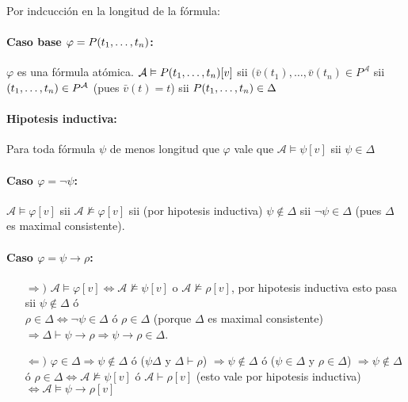 \begin{demo}
	Por indcucción en la longitud de la fórmula:
	
	\paragraph{Caso base $\varphi = P(t_1,\dots, t_{n})$:} $\varphi$ es una fórmula atómica. $\mathcal{A}\vDash P(t_1,\dots, t_{n})[v]$ sii $(\bar{v}(t_1),\dots,\bar{v}(t_n)\in P^\mathcal{A}$ sii $(t_1,\dots, t_{n})\in P^\mathcal{A}$ (pues $\bar{v}(t) = t$) sii $P(t_1,\dots, t_{n})\in\Delta$
\end{demo}
\begin{demoPart}
	\paragraph{Hipotesis inductiva:} Para toda fórmula $\psi$ de menos longitud que $\varphi$ vale que $\mathcal{A}\vDash\psi[v]$ sii $\psi\in\Delta$

\vspace*{0.25cm}
	\paragraph{Caso $\varphi = \lnot\psi$:} $\mathcal{A}\vDash\varphi[v]$ sii $\mathcal{A}\nvDash\varphi[v]$ sii (por hipotesis inductiva) $\psi\notin\Delta$ sii $\lnot\psi\in\Delta$ (pues $\Delta$ es maximal consistente). 

\vspace*{0.25cm}
	\paragraph{Caso $\varphi = \psi\to\rho$:}
	\begin{itemize}
		\item[$\bm{\Rightarrow})$] $\mathcal{A}\vDash\varphi[v] \iff \mathcal{A}\nvDash\psi[v]$ o  $\mathcal{A}\nvDash\rho[v]$, por hipotesis inductiva esto pasa sii $\psi\notin\Delta$  ó \\ $\rho\in\Delta \iff \lnot\psi\in\Delta$ ó $\rho\in\Delta$ (porque $\Delta$ es maximal consistente) $\Rightarrow \Delta\vdash\psi\to\rho \Rightarrow \psi\to\rho\in\Delta$.
		\item[$\bm{\Leftarrow})$] $\varphi\in\Delta\Rightarrow\psi\notin\Delta$ ó ($\psi\Delta$ y $\Delta\vdash\rho$) $\Rightarrow \psi\notin\Delta$ ó ($\psi\in\Delta$ y $\rho\in\Delta$) $\Rightarrow\psi\notin\Delta$ ó $\rho\in\Delta\iff \mathcal{A}\nvDash\psi[v]$ ó $\mathcal{A}\vdash\rho[v]$ (esto vale por hipotesis inductiva) $\iff \mathcal{A}\vDash\psi\to\rho[v]$
	\end{itemize}

\end{demoPart}
